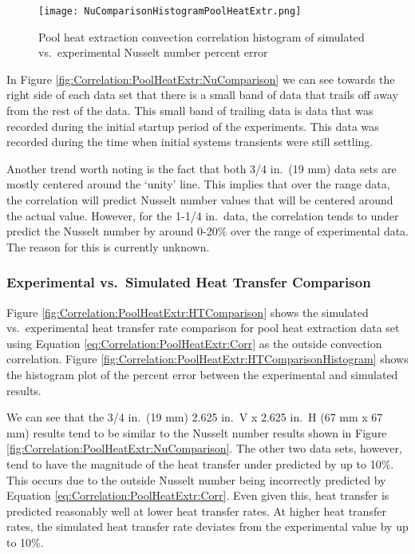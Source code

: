 		
\begin{figure}
	\centering
	\texttt{[image: NuComparisonHistogramPoolHeatExtr.png]}
	\caption{Pool heat extraction convection correlation histogram of simulated vs.\ experimental Nusselt number percent error}
	\label{fig:Correlation:PoolHeatExtr:NuComparisonHistogram}
\end{figure}

In Figure \ref{fig:Correlation:PoolHeatExtr:NuComparison} we can see towards the right side of each data set that there is a small band of data that trails off away from the rest of the data. This small band of trailing data is data that was recorded during the initial startup period of the experiments. This data was recorded during the time when initial systems transients were still settling.

Another trend worth noting is the fact that both 3/4 in.\ (19 mm) data sets are mostly centered around the `unity' line. This implies that over the range data, the correlation will predict Nusselt number values that will be centered around the actual value. However, for the 1-1/4 in.\ data, the correlation tends to under predict the Nusselt number by around 0-20\% over the range of experimental data. The reason for this is currently unknown.
			
\subsubsection{Experimental vs.\ Simulated Heat Transfer Comparison}

Figure \ref{fig:Correlation:PoolHeatExtr:HTComparison} shows the simulated vs.\ experimental heat transfer rate comparison for pool heat extraction data set using Equation \ref{eq:Correlation:PoolHeatExtr:Corr} as the outside convection correlation. Figure \ref{fig:Correlation:PoolHeatExtr:HTComparisonHistogram} shows the histogram plot of the percent error between the experimental and simulated results.

We can see that the 3/4 in.\ (19 mm) 2.625 in.\ V x 2.625 in.\ H (67 mm x 67 mm) results  tend to be similar to the Nusselt number results shown in Figure \ref{fig:Correlation:PoolHeatExtr:NuComparison}. The other two data sets, however, tend to have the magnitude of the heat transfer under predicted by up to 10\%. This occurs due to the outside Nusselt number being incorrectly predicted by Equation \ref{eq:Correlation:PoolHeatExtr:Corr}. Even given this, heat transfer is predicted reasonably well at lower heat transfer rates. At higher heat transfer rates, the simulated heat transfer rate deviates from the experimental value by up to 10\%.

